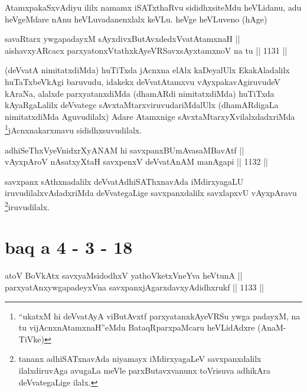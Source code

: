 \begin{artha}
AtamxpakaSxvAdiyu ililx namamx iSATxthaRvu sididhxsiteMdu heVLidanu, adu heVgeMdare nAnu heVLuvadanenxlalx keVLu. heVge heVLuveno (hAge)
\end{artha}

\begin{shl}
savaRtarx ywgapadayxM sAyxdivxButAvxdedxVvatAtamxnaH || \\
aishavxyARcacx parxyatonxVtathxkAyeVRSavxsAyx\s \s tamxnoV na tu ||  1131 ||  
\end{shl}

\begin{artha}
(deVvatA nimitatxdiMda) huTiTxda jAcnxna elAlx kaDeyalUlx EkakAladalilx huTaTxbeVkAgi baruvudu, idakekx deVvatAtamxvu vAyxpakavAgiruvudeV kAraNa, alalxde parxyatanxdiMda (dhamARdi nimitatxdiMda) huTiTxda kAyaRgaLalilx deVvatege sAvxtaMtarxviruvudariMdalUlx (dhamARdigaLa nimitatxdiMda Aguvudilalx) Adare Atamxnige sAvxtaMtarxyXvilalxdadxriMda \footnote{``ukatxM hi deVvatAyA viButAvxtf parxyatanxkAyeVRSu ywga padayxM, na tu vijAcnxnAtamxnaH''eMdu BataqRparxpaMcaru heVLidAdxre (AnaM-TiVke)}jAcnxnakarxmavu sididhxsuvudilalx.
\end{artha}


\begin{shl}
adhiSeThxVyeVnidxrXyANAM hi savxpanxBUmAvasaMBavAtf ||  \\
vAyxpAroV nAsatxyXtaH savxpenxV deVvatAnAM manAgapi ||  1132 ||  
\end{shl}

\begin{artha}
savxpanx sAthxnadalilx deVvatAdhiSAThxnavAda iMdirxyagaLU iruvudilalxvAdadxriMda deVvategaLige savxpanxdalilx savxlapxvU vAyxpAravu \footnote{tananx adhiSATxnavAda niyamayx iMdirxyagaLeV savxpanxdalilx ilalxdiruvAga avugaLa meVle parxButavxvanunx toVrisuva adhikAra deVvategaLige ilalx.}iruvudilalx.
\end{artha}

\section*{baq a 4 - 3 - 18}


\begin{shl}
atoV BoVkAtx savxyaMsidodhxV yathoVketxVneYva heVtunA || \\
parxyatAnxywgapadeyxVna savxpanxjAgarxdavxyAdidhxrukf ||  1133 ||  
\end{shl}

